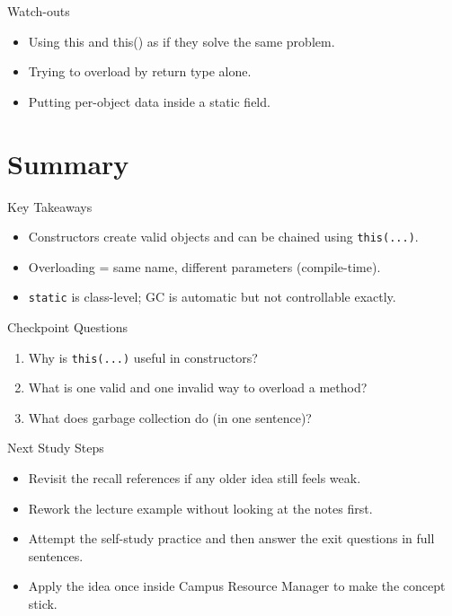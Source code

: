 \documentclass{beamer}
\begin{document}
\begin{frame}{Watch-outs}
\begin{itemize}[<+->]
  \item Using this and this() as if they solve the same problem.
  \item Trying to overload by return type alone.
  \item Putting per-object data inside a static field.
\end{itemize}
  \slidesources{\OOPSUnitIISources}
\end{frame}

\section{Summary}
\label{sec:summary}

\begin{frame}{Key Takeaways}
  \begin{itemize}[<+->]
    \item Constructors create valid objects and can be chained using \texttt{this(...)}.
    \item Overloading = same name, different parameters (compile-time).
    \item \texttt{static} is class-level; GC is automatic but not controllable exactly.
  \end{itemize}
  \slidesources{\OOPSUnitIISources}
\end{frame}

\begin{frame}{Checkpoint Questions}
  \begin{enumerate}[<+->]
    \item Why is \texttt{this(...)} useful in constructors?
    \item What is one valid and one invalid way to overload a method?
    \item What does garbage collection do (in one sentence)?
  \end{enumerate}
  \slidesources{\OOPSUnitIISources}
\end{frame}

\begin{frame}{Next Study Steps}
\begin{itemize}[<+->]
  \item Revisit the recall references if any older idea still feels weak.
  \item Rework the lecture example without looking at the notes first.
  \item Attempt the self-study practice and then answer the exit questions in full sentences.
  \item Apply the idea once inside Campus Resource Manager to make the concept stick.
\end{itemize}
  \slidesources{\OOPSUnitIISources}
\end{frame}
\end{document}
